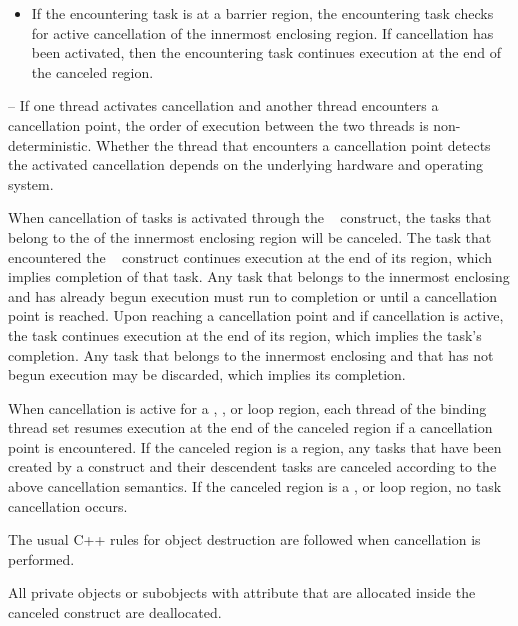 {{{{\begin{itemize}
\item If the encountering task is at a barrier region, the encountering task 
checks for active cancellation of the innermost enclosing  
region. If cancellation has been activated, then the encountering task 
continues execution at the end of the canceled region.
\end{itemize}

\notestart
\noteheader – If one thread activates cancellation and another thread encounters a cancellation 
point, the order of execution between the two threads is non-deterministic. 
Whether the thread that encounters a cancellation point detects the activated cancellation 
depends on the underlying hardware and operating system.
\noteend

When cancellation of tasks is activated through the
~ construct, the tasks that belong to the
 of the innermost enclosing  region
will be canceled. The task that encountered the
~ construct continues execution at the
end of its  region, which implies completion of that
task. Any task that belongs to the innermost enclosing
 and has already begun execution must run to
completion or until a cancellation point is reached. Upon reaching a
cancellation point and if cancellation is active, the task continues
execution at the end of its  region, which implies the
task's completion. Any task that belongs to the innermost enclosing
 and that has not begun execution may be discarded,
which implies its completion.

When cancellation is active for a , , or loop region, each 
thread of the binding thread set resumes execution at the end of the canceled region if a 
cancellation point is encountered. If the canceled region is a  region, any 
tasks that have been created by a  construct and their descendent tasks are 
canceled according to the above  cancellation semantics. If the canceled 
region is a , or loop region, no task cancellation occurs.

\cppspecificstart
The usual C++ rules for object destruction are followed when cancellation is performed.
\cppspecificend

\fortranspecificstart
All private objects or subobjects with  attribute that are allocated inside 
the canceled construct are deallocated.
\fortranspecificend

}}}}
